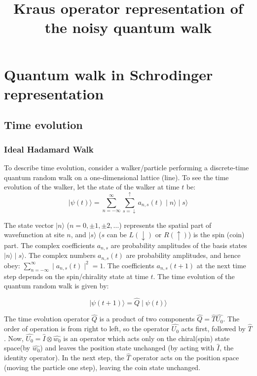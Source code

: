 \documentclass[english]{article}
\begin{document}
\title{Kraus operator representation of the noisy quantum walk}
\maketitle

\section{Quantum walk in Schrodinger representation}
\subsection{Time evolution}
\subsubsection{Ideal Hadamard Walk} \label{sec:qrw-evolution}

To describe time evolution, consider a walker/particle performing a discrete-time quantum random walk on a one-dimensional lattice (line). To see the time evolution of the walker, let the state of the walker at time $t$ be:
\begin{equation} \label{eq:initial-state}
\mid\! \psi(t)\rangle = \displaystyle \sum\limits_{n = -\infty}^{\infty}\sum\limits_{s=\downarrow}^{\uparrow} a_{n,s}(t)\mid\! n\rangle\mid\! s\rangle
\end{equation}

The state vector $\mid\! n\rangle$ ($n = 0, \pm1, \pm2, \ldots$) represents the spatial part of wavefunction at site $n$, and $\mid\! s\rangle$ ($s$ can be $L (\downarrow)$ or $R (\uparrow)$) is the spin (coin) part. The complex coefficients $a_{n,s}$ are probability amplitudes of the basis states $\mid\! n\rangle \mid\! s\rangle$. The complex numbers $a_{n,s}(t)$ are probability amplitudes, and hence obey: $\sum\limits_{n = -\infty}^{\infty} \mid\! a_{n,s}(t)\!\mid^{2} = 1$.  The coefficients $a_{n,s}(t+1)$ at the next time step depends on the spin/chirality state at time $t$. The time evolution of the quantum random walk is given by:

\begin{equation} \label{eq:time-evolution}
\mid\! \psi(t+1)\rangle = \hat{Q}\mid\! \psi(t)\rangle
\end{equation} 

The time evolution operator $\hat{Q}$ is a product of two components $\hat{Q} = \hat{T}\hat{U_{0}}$. The order of operation is from right to left, so the operator $\hat{U_{0}}$ acts first, followed by $\hat{T}$. Now, $\hat{U_{0}} = \hat{I} \otimes \hat{w_{0}}$ is an operator which acts only on the chiral(spin) state space(by $\hat{w_{0}}$) and leaves the position state unchanged (by acting with $\hat{I}$, the identity operator). In the next step, the $\hat{T}$ operator acts on the position space (moving the particle one step), leaving the coin state unchanged. \newline
\end{document}
